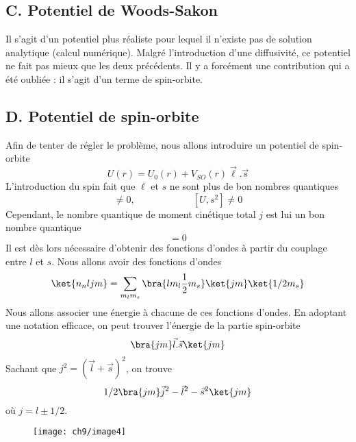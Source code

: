 \subsection{C. Potentiel de Woods-Sakon}
Il s'agit d'un potentiel plus réaliste pour lequel il n'existe pas de solution analytique (calcul numérique). 
Malgré l'introduction d'une diffusivité, ce potentiel ne fait pas mieux que les deux précédents. Il y a 
forcément une contribution qui a été oubliée : il s'agit d'un terme de spin-orbite.


\subsection{D. Potentiel de spin-orbite}
Afin de tenter de régler le problème, nous allons introduire un potentiel de spin-orbite
\begin{equation}
U(r) = U_0(r)+V_{SO}(r)\vec\ell.\vec s
\end{equation}
L'introduction du spin fait que $\ell$ et $s$ ne sont plus de bon nombres quantiques
\begin{equation}
[U,\ell^2] \neq 0,\qquad\qquad\qquad [U,s^2]\neq 0
\end{equation}
Cependant, le nombre quantique de moment cinétique total $j$ est lui un bon nombre quantique
\begin{equation}
[U,j^2]=0
\end{equation}
Il est dès lors nécessaire d'obtenir des fonctions d'ondes à partir du couplage entre $l$ et $s$. Nous allons
avoir des fonctions d'ondes
\begin{equation}
\ket{n_n l j m} = \sum_{m_lm_s} \bra{l m_l \frac{1}{2} m_s}\ket{jm}\ket{1/2 m_s}
\end{equation}
Nous allons associer une énergie à chacune de ces fonctions d'ondes. En adoptant une notation efficace, 
on peut trouver l'énergie de la partie spin-orbite
\begin{equation}
\bra{jm} \vec l . \vec s\ket{jm}
\end{equation}
Sachant que $j^2 = (\vec l + \vec s)^2$, on trouve
\begin{equation}
1/2\bra{jm} \vec j^2-\vec l^2-\vec s^2 \ket{jm}
\end{equation}
où $j = l\pm 1/2$.\\

	\begin{wrapfigure}[14]{r}{5.5cm}
	\vspace{-5mm}
	\texttt{[image: ch9/image4]}
	\end{wrapfigure}
	
